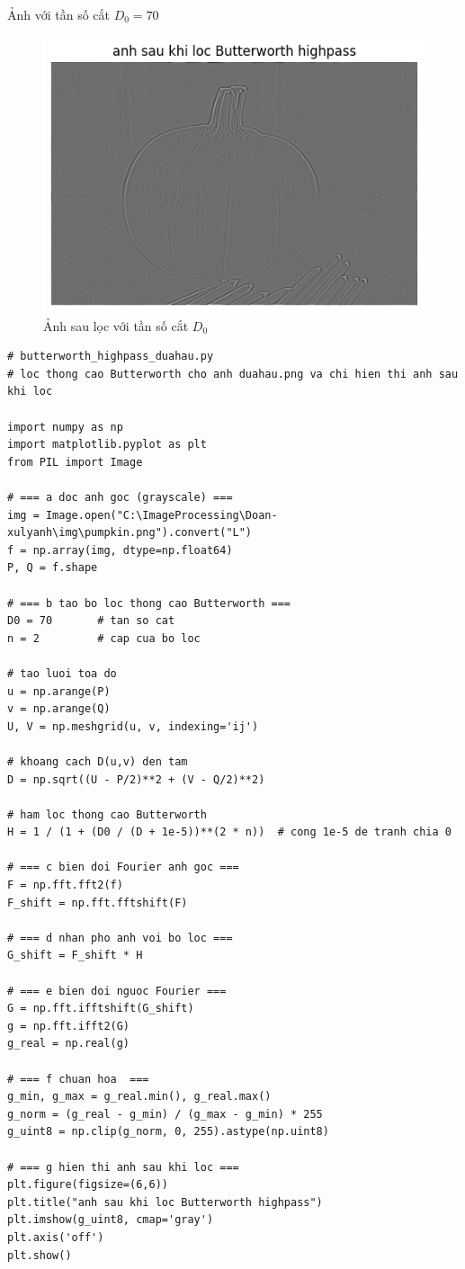 \documentclass[12pt,a4paper]{report}
\numberwithin{equation}{section}
\theoremstyle{definition} %
\begin{document}
Ảnh với tần số cắt $D_0=70$
\begin{figure}[H]
\centering
\includegraphics[width=0.7\linewidth]{img/butterworthhighpass/anhsaulocD0=70.png}
\caption{Ảnh sau lọc với tần số cắt $D_0$}
\label{fig138}
\end{figure}

\begin{lstlisting}
# butterworth_highpass_duahau.py
# loc thong cao Butterworth cho anh duahau.png va chi hien thi anh sau khi loc

import numpy as np
import matplotlib.pyplot as plt
from PIL import Image

# === a doc anh goc (grayscale) ===
img = Image.open("C:\ImageProcessing\Doan-xulyanh\img\pumpkin.png").convert("L")
f = np.array(img, dtype=np.float64)
P, Q = f.shape

# === b tao bo loc thong cao Butterworth ===
D0 = 70       # tan so cat
n = 2         # cap cua bo loc

# tao luoi toa do
u = np.arange(P)
v = np.arange(Q)
U, V = np.meshgrid(u, v, indexing='ij')

# khoang cach D(u,v) den tam
D = np.sqrt((U - P/2)**2 + (V - Q/2)**2)

# ham loc thong cao Butterworth
H = 1 / (1 + (D0 / (D + 1e-5))**(2 * n))  # cong 1e-5 de tranh chia 0

# === c bien doi Fourier anh goc ===
F = np.fft.fft2(f)
F_shift = np.fft.fftshift(F)

# === d nhan pho anh voi bo loc ===
G_shift = F_shift * H

# === e bien doi nguoc Fourier ===
G = np.fft.ifftshift(G_shift)
g = np.fft.ifft2(G)
g_real = np.real(g)

# === f chuan hoa  ===
g_min, g_max = g_real.min(), g_real.max()
g_norm = (g_real - g_min) / (g_max - g_min) * 255
g_uint8 = np.clip(g_norm, 0, 255).astype(np.uint8)

# === g hien thi anh sau khi loc ===
plt.figure(figsize=(6,6))
plt.title("anh sau khi loc Butterworth highpass")
plt.imshow(g_uint8, cmap='gray')
plt.axis('off')
plt.show()

\end{lstlisting}
\end{document}
